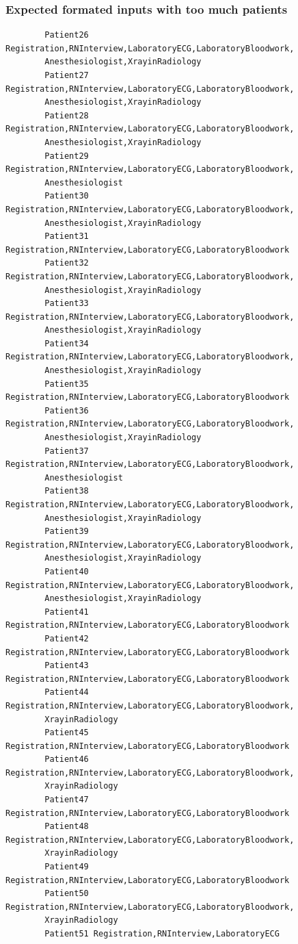 \documentclass[12pt]{article}
\begin{document}
		
		\subsubsection{Expected formated inputs with too much patients}
		\begin{verbatim}
		Patient26 Registration,RNInterview,LaboratoryECG,LaboratoryBloodwork,
		Anesthesiologist,XrayinRadiology
		Patient27 Registration,RNInterview,LaboratoryECG,LaboratoryBloodwork,
		Anesthesiologist,XrayinRadiology
		Patient28 Registration,RNInterview,LaboratoryECG,LaboratoryBloodwork,
		Anesthesiologist,XrayinRadiology
		Patient29 Registration,RNInterview,LaboratoryECG,LaboratoryBloodwork,
		Anesthesiologist
		Patient30 Registration,RNInterview,LaboratoryECG,LaboratoryBloodwork,
		Anesthesiologist,XrayinRadiology
		Patient31 Registration,RNInterview,LaboratoryECG,LaboratoryBloodwork
		Patient32 Registration,RNInterview,LaboratoryECG,LaboratoryBloodwork,
		Anesthesiologist,XrayinRadiology
		Patient33 Registration,RNInterview,LaboratoryECG,LaboratoryBloodwork,
		Anesthesiologist,XrayinRadiology
		Patient34 Registration,RNInterview,LaboratoryECG,LaboratoryBloodwork,
		Anesthesiologist,XrayinRadiology
		Patient35 Registration,RNInterview,LaboratoryECG,LaboratoryBloodwork
		Patient36 Registration,RNInterview,LaboratoryECG,LaboratoryBloodwork,
		Anesthesiologist,XrayinRadiology
		Patient37 Registration,RNInterview,LaboratoryECG,LaboratoryBloodwork,
		Anesthesiologist
		Patient38 Registration,RNInterview,LaboratoryECG,LaboratoryBloodwork,
		Anesthesiologist,XrayinRadiology
		Patient39 Registration,RNInterview,LaboratoryECG,LaboratoryBloodwork,
		Anesthesiologist,XrayinRadiology
		Patient40 Registration,RNInterview,LaboratoryECG,LaboratoryBloodwork,
		Anesthesiologist,XrayinRadiology
		Patient41 Registration,RNInterview,LaboratoryECG,LaboratoryBloodwork
		Patient42 Registration,RNInterview,LaboratoryECG,LaboratoryBloodwork
		Patient43 Registration,RNInterview,LaboratoryECG,LaboratoryBloodwork
		Patient44 Registration,RNInterview,LaboratoryECG,LaboratoryBloodwork,
		XrayinRadiology
		Patient45 Registration,RNInterview,LaboratoryECG,LaboratoryBloodwork
		Patient46 Registration,RNInterview,LaboratoryECG,LaboratoryBloodwork,
		XrayinRadiology
		Patient47 Registration,RNInterview,LaboratoryECG,LaboratoryBloodwork
		Patient48 Registration,RNInterview,LaboratoryECG,LaboratoryBloodwork,
		XrayinRadiology
		Patient49 Registration,RNInterview,LaboratoryECG,LaboratoryBloodwork
		Patient50 Registration,RNInterview,LaboratoryECG,LaboratoryBloodwork,
		XrayinRadiology
		Patient51 Registration,RNInterview,LaboratoryECG

\end{verbatim}
\end{document}
